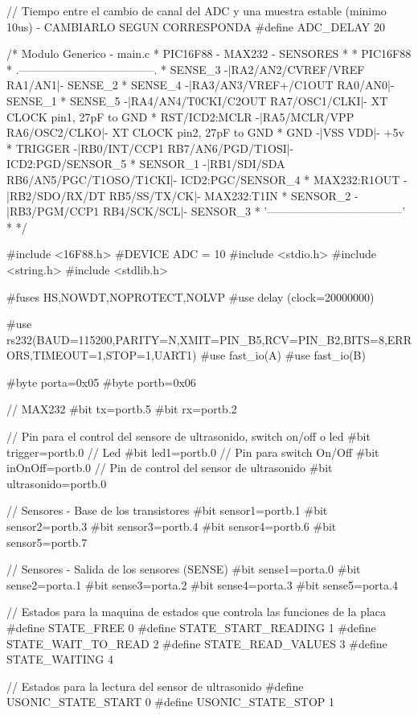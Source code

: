 {\begin{verbatimtab}
// Tiempo entre el cambio de canal del ADC y una muestra estable (minimo 10us) - CAMBIARLO SEGUN CORRESPONDA
#define ADC_DELAY	20

/* Modulo Generico - main.c
 * PIC16F88 - MAX232 - SENSORES
 *
 *                               PIC16F88
 *                .------------------------------------.
 *       SENSE_3 -|RA2/AN2/CVREF/VREF           RA1/AN1|- SENSE_2
 *       SENSE_4 -|RA3/AN3/VREF+/C1OUT          RA0/AN0|- SENSE_1
 *       SENSE_5 -|RA4/AN4/T0CKI/C2OUT    RA7/OSC1/CLKI|- XT CLOCK pin1, 27pF to GND
 * RST/ICD2:MCLR -|RA5/MCLR/VPP           RA6/OSC2/CLKO|- XT CLOCK pin2, 27pF to GND
 *           GND -|VSS                              VDD|- +5v
 *       TRIGGER -|RB0/INT/CCP1       RB7/AN6/PGD/T1OSI|- ICD2:PGD/SENSOR_5
 *      SENSOR_1 -|RB1/SDI/SDA  RB6/AN5/PGC/T1OSO/T1CKI|- ICD2:PGC/SENSOR_4
 *  MAX232:R1OUT -|RB2/SDO/RX/DT           RB5/SS/TX/CK|- MAX232:T1IN
 *     	SENSOR_2 -|RB3/PGM/CCP1             RB4/SCK/SCL|- SENSOR_3
 *                '------------------------------------'
 *    
 */

#include <16F88.h>
#DEVICE ADC = 10
#include <stdio.h>
#include <string.h>
#include <stdlib.h>

#fuses HS,NOWDT,NOPROTECT,NOLVP
#use delay (clock=20000000)

#use rs232(BAUD=115200,PARITY=N,XMIT=PIN_B5,RCV=PIN_B2,BITS=8,ERRORS,TIMEOUT=1,STOP=1,UART1)
#use fast_io(A)
#use fast_io(B)

#byte porta=0x05
#byte portb=0x06

// MAX232
#bit tx=portb.5
#bit rx=portb.2

// Pin para el control del sensore de ultrasonido, switch on/off o led
#bit trigger=portb.0
// Led
#bit led1=portb.0
// Pin para switch On/Off
#bit inOnOff=portb.0
// Pin de control del sensor de ultrasonido
#bit ultrasonido=portb.0

// Sensores - Base de los transistores
#bit sensor1=portb.1
#bit sensor2=portb.3
#bit sensor3=portb.4
#bit sensor4=portb.6
#bit sensor5=portb.7

// Sensores - Salida de los sensores (SENSE)
#bit sense1=porta.0
#bit sense2=porta.1
#bit sense3=porta.2
#bit sense4=porta.3
#bit sense5=porta.4

// Estados para la maquina de estados que controla las funciones de la placa
#define STATE_FREE			0
#define STATE_START_READING	1 
#define STATE_WAIT_TO_READ	2
#define STATE_READ_VALUES	3
#define STATE_WAITING		4

// Estados para la lectura del sensor de ultrasonido
#define USONIC_STATE_START	0
#define USONIC_STATE_STOP	1 


\end{verbatimtab}}
